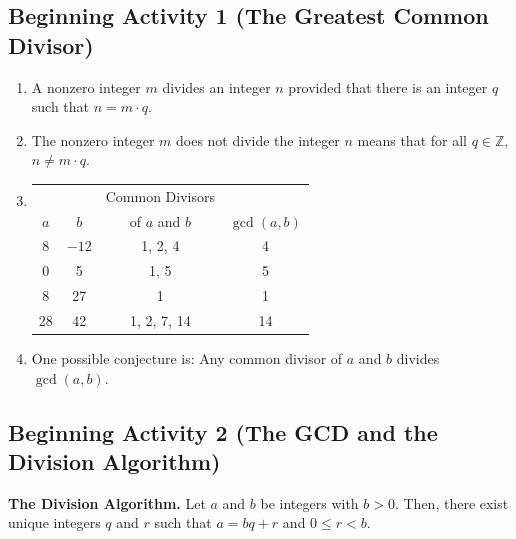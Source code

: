 \documentclass[11pt]{article}
\begin{document}
\subsection*{Beginning Activity 1 (The Greatest Common Divisor)}
\begin{enumerate}
\item A nonzero integer  $m$  divides an integer  $n$  provided that there is an integer  $q$  such that  $n = m \cdot q$.

\item The nonzero integer  $m$  does not divide the integer  $n$  means that for all  $q \in \mathbb{Z}$, $n \ne m \cdot q$.


\item \begin{tabular}[t]{| c | c | c | c |}  \hline
   &   &  Common Divisors  &   \\
$a$  &  $b$  &  of $a$ and $b$  &  $\gcd \left( {a, b} \right) $ \\ \hline
8  &  $-12$  &  1, 2, 4  &  4  \\ \hline
0  &  5  &  1, 5  &  5  \\ \hline
8  &  27  &  1  &  1  \\ \hline
28  &  42  &  1, 2, 7, 14  &  14  \\ \hline
\end{tabular}

\item One possible conjecture is:  Any common divisor of  $a$  and  $b$  divides  
$\gcd \left( {a, b} \right)$.
\end{enumerate}
\hbreak




\subsection*{Beginning Activity 2 (The GCD and the Division Algorithm)}
\textbf{The Division Algorithm.}  Let  $a$  and  $b$  be integers with  $b > 0$.  Then, there exist unique integers  $q$  and  $r$  such that  $a = bq + r$ and $0 \leq r < b$.
\end{document}
